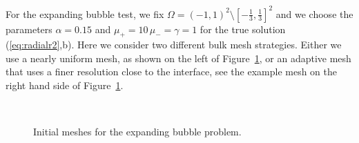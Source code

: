 \documentclass[a4paper,12pt,onecolumn]{article}
\begin{document}
For the expanding bubble test, we fix $\Omega = (-1,1)^2 \setminus [-\frac13,\frac13]^2$ and we choose the parameters
$\alpha = 0.15$ and $\mu_+ = 10\,\mu_- = \gamma = 1$
for the true solution (\ref{eq:radialr2},b). 
Here we consider two different bulk mesh strategies. Either we use a nearly
uniform mesh, as shown on the left of Figure~\ref{fig:meshes_expanding},
or an adaptive mesh that uses a finer resolution close to the interface,
see the example mesh on the right hand side of 
Figure~\ref{fig:meshes_expanding}.
\begin{figure}[htbp]
  \centering
  \quad
  \\
  \caption{Initial meshes for the expanding bubble problem.}
  \label{fig:meshes_expanding}
\end{figure}
\end{document}
